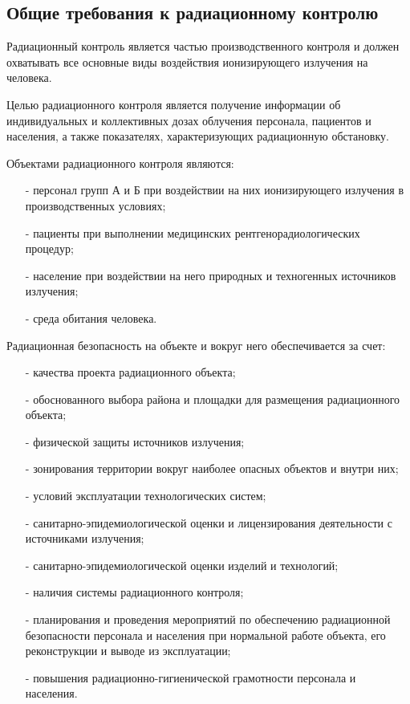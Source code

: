\subsection{Общие требования к радиационному контролю} \label{subsect1_1_2}
	Радиационный контроль является частью производственного контроля и должен 
	охватывать все основные виды воздействия ионизирующего излучения на человека.

	Целью радиационного контроля является получение информации об индивидуальных 
	и коллективных дозах облучения персонала, пациентов и населения, а также 
	показателях, характеризующих радиационную обстановку.

	Объектами радиационного контроля являются:
	\begin{itemize}
		\item[-] персонал групп А и Б при воздействии на них ионизирующего 
			излучения в производственных условиях;
		\item[-] пациенты при выполнении медицинских рентгенорадиологических 
			процедур;
		\item[-] население при воздействии на него природных и техногенных 
			источников излучения;
		\item[-] среда обитания человека.
	\end{itemize}

	Радиационная безопасность на объекте и вокруг него обеспечивается за счет:
	\begin{itemize}
		\item[-] качества проекта радиационного объекта;
		\item[-] обоснованного выбора района и площадки для размещения 
			радиационного объекта;
		\item[-] физической защиты источников излучения;
		\item[-] зонирования территории вокруг наиболее опасных объектов и 
			внутри них; 
		\item[-] условий эксплуатации технологических систем;
		\item[-] санитарно-эпидемиологической оценки и лицензирования 
			деятельности с источниками излучения;
		\item[-] санитарно-эпидемиологической оценки изделий и технологий;
		\item[-] наличия системы радиационного контроля;
		\item[-] планирования и проведения мероприятий по обеспечению 
			радиационной безопасности персонала и населения при нормальной 
			работе объекта, его реконструкции и выводе из эксплуатации;
		\item[-] повышения радиационно-гигиенической грамотности персонала и 
			населения.
	\end{itemize}

